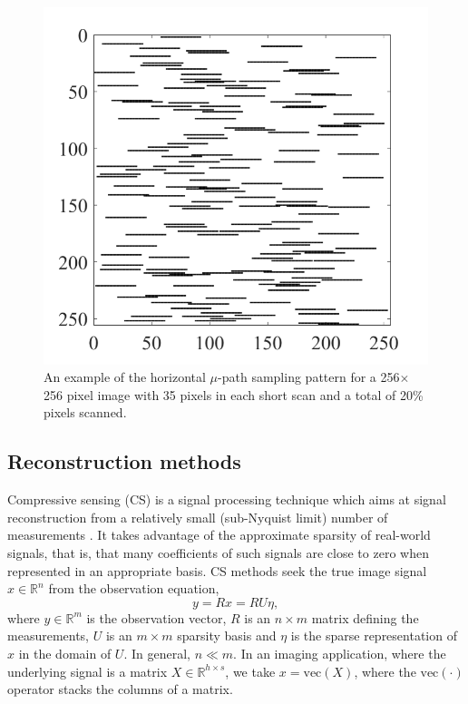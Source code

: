 \documentclass[twocolumn,oneside]{IEEEtran/IEEEtran}
\begin{document}
\begin{figure}
  \centering
  \includegraphics[width=0.7\columnwidth]{figures-SBA/random_mask.pdf}
  \caption{An example of the horizontal $\mu$-path sampling pattern
    for a 256$\times$256 pixel image with 35 pixels in each short scan
    and a total of 20\% pixels scanned.}
  \label{fig:mu_mask}
\end{figure}
\subsection{Reconstruction methods}
\label{sec:reconstructionMethods}
Compressive sensing (CS) is a signal processing technique which aims
at signal reconstruction from a relatively small (sub-Nyquist limit)
number of measurements \cite{carmi2014compressive}. It takes advantage
of the approximate sparsity of real-world signals, that is, that many
coefficients of such signals are close to zero when represented in an
appropriate basis. CS methods seek the true image signal
$x\in\mathbb{R}^n$ from the observation equation,
\begin{equation}\label{op:observation}
  y = R x = RU\eta,
\end{equation}
\noindent where $y\in\mathbb{R}^m$ is the observation vector, $R$ is
an $n\times m$ matrix defining the measurements, $U$ is an $m\times m$
sparsity basis and $\eta$ is the sparse representation of $x$ in the
domain of $U$. In general, $n\ll m$. In an imaging application, where
the underlying signal is a matrix $X\in\mathbb{R}^{h\times s}$, we
take $x=\text{vec}(X)$, where the $\text{vec}(\cdot)$ operator stacks
the columns of a matrix.
\end{document}
